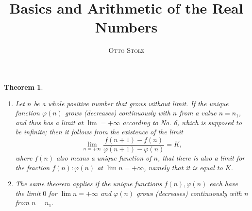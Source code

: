 \documentclass[a4paper]{amsbook}
\title{Basics and Arithmetic of the Real Numbers}
\author{\textsc{Otto Stolz}}
\newtheorem*{theorem*}{Theorem}
\theoremstyle{remark}
\begin{document}
\frontmatter
\maketitle

\mainmatter

\begin{theorem*}
  \leavevmode
  \begin{enumerate}[label=\enumparen{\arabic*}]
  \item Let \(n\) be a whole positive number that grows without limit.  If the unique function \(\varphi(n)\) grows (decreases) continuously with \(n\) from a value \(n = n_1\), and thus has a limit at \(\lim = +\infty\) according to No. 6, which is supposed to be infinite; then it follows from the existence of the limit
    \begin{equation*}
      \lim_{n=+\infty} \frac{f(n+1)-f(n)}{\varphi(n+1)-\varphi(n)} = K,
    \end{equation*}
    where \(f(n)\) also means a unique function of \(n\), that there is also a limit for the fraction \(f(n):\varphi(n)\) at \(\lim n = +\infty\), namely that it is equal to \(K\).

  \item The same theorem applies if the unique functions \(f(n), \varphi(n)\) each have the limit \(0\) for \(\lim n = +\infty\) and \(\varphi(n)\) grows (decreases) continuously with \(n\) from \(n = n_1\).
  \end{enumerate}


\end{theorem*}
\end{document}
